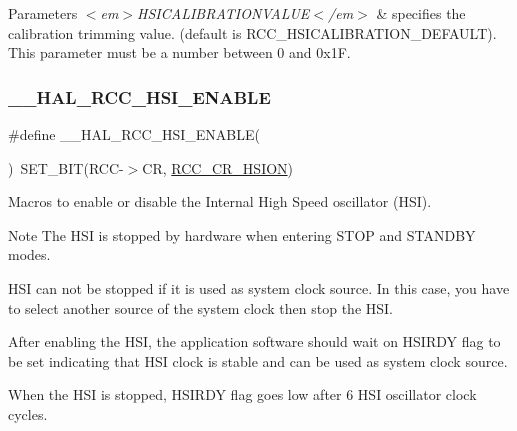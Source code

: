 \begin{DoxyParams}{Parameters}
{\em $<$em$>$\+H\+S\+I\+C\+A\+L\+I\+B\+R\+A\+T\+I\+O\+N\+V\+A\+L\+U\+E$<$/em$>$} & specifies the calibration trimming value. (default is R\+C\+C\+\_\+\+H\+S\+I\+C\+A\+L\+I\+B\+R\+A\+T\+I\+O\+N\+\_\+\+D\+E\+F\+A\+U\+LT). This parameter must be a number between 0 and 0x1F. \\
\hline
\end{DoxyParams}
\mbox{\label{group___r_c_c___h_s_i___configuration_gaab944f562b53fc74bcc0e4958388fd42}} 
\subsubsection{\texorpdfstring{\+\_\+\+\_\+\+H\+A\+L\+\_\+\+R\+C\+C\+\_\+\+H\+S\+I\+\_\+\+E\+N\+A\+B\+LE}{\_\_HAL\_RCC\_HSI\_ENABLE}}
{\footnotesize\ttfamily \#define \+\_\+\+\_\+\+H\+A\+L\+\_\+\+R\+C\+C\+\_\+\+H\+S\+I\+\_\+\+E\+N\+A\+B\+LE(\begin{DoxyParamCaption}{ }\end{DoxyParamCaption})~S\+E\+T\+\_\+\+B\+IT(R\+CC-\/$>$CR, \hyperlink{group___peripheral___registers___bits___definition_gaf4fcacf94a97f7d49a70e089b39cf474}{R\+C\+C\+\_\+\+C\+R\+\_\+\+H\+S\+I\+ON})}



Macros to enable or disable the Internal High Speed oscillator (H\+SI). 

\begin{DoxyNote}{Note}
The H\+SI is stopped by hardware when entering S\+T\+OP and S\+T\+A\+N\+D\+BY modes. 

H\+SI can not be stopped if it is used as system clock source. In this case, you have to select another source of the system clock then stop the H\+SI. 

After enabling the H\+SI, the application software should wait on H\+S\+I\+R\+DY flag to be set indicating that H\+SI clock is stable and can be used as system clock source. 

When the H\+SI is stopped, H\+S\+I\+R\+DY flag goes low after 6 H\+SI oscillator clock cycles. 
\end{DoxyNote}
